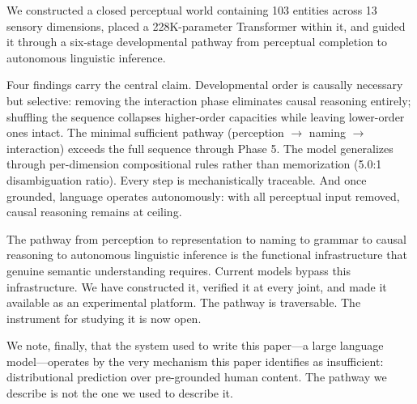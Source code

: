 \documentclass{article}
\begin{document}
We constructed a closed perceptual world containing 103 entities across 13 sensory dimensions, placed a 228K-parameter Transformer within it, and guided it through a six-stage developmental pathway from perceptual completion to autonomous linguistic inference.

Four findings carry the central claim. Developmental order is causally necessary but selective: removing the interaction phase eliminates causal reasoning entirely; shuffling the sequence collapses higher-order capacities while leaving lower-order ones intact. The minimal sufficient pathway (perception $\rightarrow$ naming $\rightarrow$ interaction) exceeds the full sequence through Phase 5. The model generalizes through per-dimension compositional rules rather than memorization (5.0:1 disambiguation ratio). Every step is mechanistically traceable. And once grounded, language operates autonomously: with all perceptual input removed, causal reasoning remains at ceiling.

The pathway from perception to representation to naming to grammar to causal reasoning to autonomous linguistic inference is the functional infrastructure that genuine semantic understanding requires. Current models bypass this infrastructure. We have constructed it, verified it at every joint, and made it available as an experimental platform. The pathway is traversable. The instrument for studying it is now open.

We note, finally, that the system used to write this paper---a large language model---operates by the very mechanism this paper identifies as insufficient: distributional prediction over pre-grounded human content. The pathway we describe is not the one we used to describe it.



\end{document}
